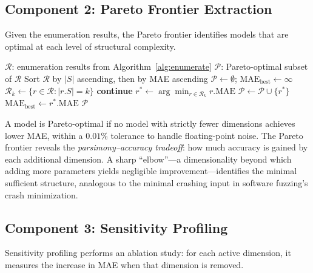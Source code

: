 \documentclass[manuscript,review,anonymous]{acmart}
\newcommand{\MAE}{\mathrm{MAE}}
\begin{document}
\subsection{Component 2: Pareto Frontier Extraction}

Given the enumeration results, the Pareto frontier identifies models that are optimal at each level of structural complexity.

\begin{algorithm}[t]
\caption{ParetoFrontier$(\mathcal{R})$}
\label{alg:pareto}
\begin{algorithmic}[1]
\REQUIRE $\mathcal{R}$: enumeration results from Algorithm~\ref{alg:enumerate}
\ENSURE $\mathcal{P}$: Pareto-optimal subset of $\mathcal{R}$
\STATE Sort $\mathcal{R}$ by $|S|$ ascending, then by MAE ascending
\STATE $\mathcal{P} \leftarrow \emptyset$; $\MAE_{\mathrm{best}} \leftarrow \infty$
    \STATE $\mathcal{R}_k \leftarrow \{r \in \mathcal{R} : |r.S| = k\}$
        \STATE \textbf{continue}
    \ENDIF
    \STATE $r^* \leftarrow \arg\min_{r \in \mathcal{R}_k} r.\MAE$
    \IF{$r^*.\MAE < \MAE_{\mathrm{best}} \times (1 - 10^{-4})$} %
        \STATE $\mathcal{P} \leftarrow \mathcal{P} \cup \{r^*\}$
        \STATE $\MAE_{\mathrm{best}} \leftarrow r^*.\MAE$
    \ENDIF
\ENDFOR
\RETURN $\mathcal{P}$
\end{algorithmic}
\end{algorithm}

A model is Pareto-optimal if no model with strictly fewer dimensions achieves lower MAE, within a $0.01\%$ tolerance to handle floating-point noise.
The Pareto frontier reveals the \emph{parsimony--accuracy tradeoff}: how much accuracy is gained by each additional dimension.
A sharp ``elbow''---a dimensionality beyond which adding more parameters yields negligible improvement---identifies the minimal sufficient structure, analogous to the minimal crashing input in software fuzzing's crash minimization.

\subsection{Component 3: Sensitivity Profiling}

Sensitivity profiling performs an ablation study: for each active dimension, it measures the increase in MAE when that dimension is removed.
\end{document}
